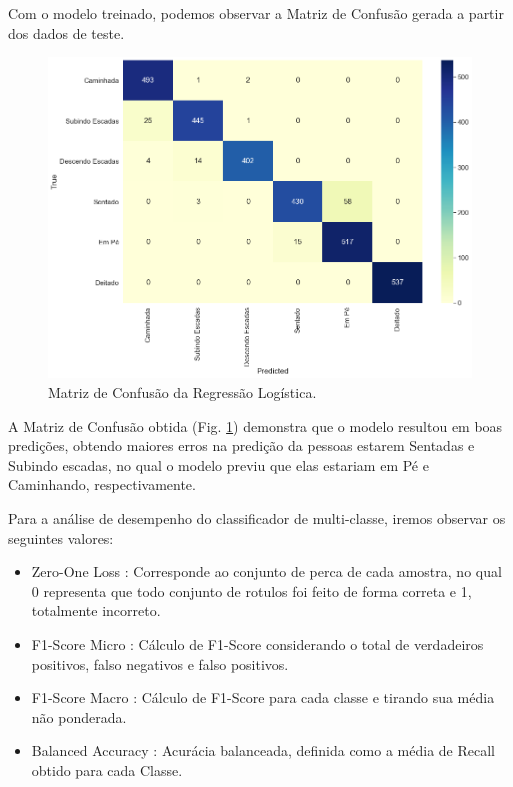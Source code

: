 \documentclass[12pt]{article}
\begin{document}
Com o modelo treinado, podemos observar a Matriz de Confusão gerada a partir dos dados de teste.

\begin{figure}[H]
	\centering
	\includegraphics[width=.8\linewidth]{images/conf_m_2_lr.png}
	\caption{Matriz de Confusão da Regressão Logística.}
	\label{fig:conf_m_2_lr}
\end{figure}

A Matriz de Confusão obtida (Fig. \ref{fig:conf_m_2_lr}) demonstra que o modelo resultou em boas predições, obtendo maiores erros na predição da pessoas estarem Sentadas e Subindo escadas, no qual o modelo previu que elas estariam em Pé e Caminhando, respectivamente. 

Para a análise de desempenho do classificador de multi-classe, iremos observar os seguintes valores:

\begin{itemize}
	\item Zero-One Loss : Corresponde ao conjunto de perca de cada amostra, no qual 0 representa que todo conjunto de rotulos foi feito de forma correta e 1, totalmente incorreto.
	
	\item F1-Score Micro : Cálculo de F1-Score considerando o total de verdadeiros positivos, falso negativos e falso positivos.
	
	\item F1-Score Macro : Cálculo de F1-Score para cada classe e tirando sua média não ponderada.
	
	\item Balanced Accuracy : Acurácia balanceada, definida como a média de Recall obtido para cada Classe.
\end{itemize}
\end{document}
